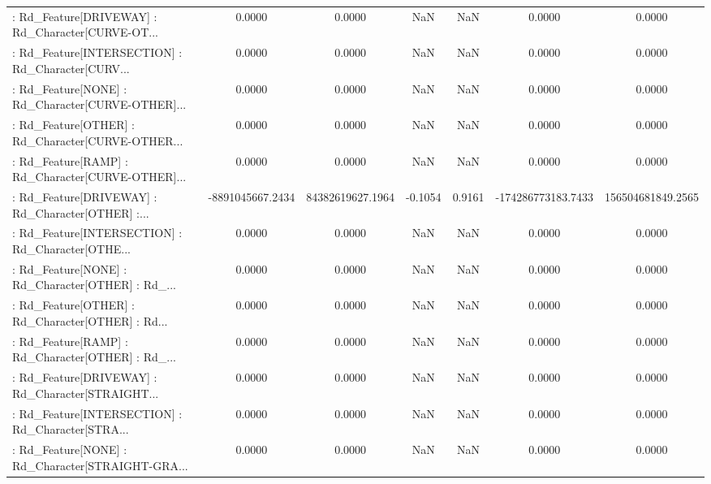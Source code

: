 \begin{longtable}{p{4cm}cccccc}
 : Rd\_Feature[DRIVEWAY] : Rd\_Character[CURVE-OT... &            0.0000 &            0.0000 &     NaN &          NaN &             0.0000 &            0.0000 \\
 : Rd\_Feature[INTERSECTION] : Rd\_Character[CURV... &            0.0000 &            0.0000 &     NaN &          NaN &             0.0000 &            0.0000 \\
 : Rd\_Feature[NONE] : Rd\_Character[CURVE-OTHER]... &            0.0000 &            0.0000 &     NaN &          NaN &             0.0000 &            0.0000 \\
 : Rd\_Feature[OTHER] : Rd\_Character[CURVE-OTHER... &            0.0000 &            0.0000 &     NaN &          NaN &             0.0000 &            0.0000 \\
 : Rd\_Feature[RAMP] : Rd\_Character[CURVE-OTHER]... &            0.0000 &            0.0000 &     NaN &          NaN &             0.0000 &            0.0000 \\
 : Rd\_Feature[DRIVEWAY] : Rd\_Character[OTHER] :... &  -8891045667.2434 &  84382619627.1964 & -0.1054 &       0.9161 & -174286773183.7433 & 156504681849.2565 \\
 : Rd\_Feature[INTERSECTION] : Rd\_Character[OTHE... &            0.0000 &            0.0000 &     NaN &          NaN &             0.0000 &            0.0000 \\
 : Rd\_Feature[NONE] : Rd\_Character[OTHER] : Rd\_... &            0.0000 &            0.0000 &     NaN &          NaN &             0.0000 &            0.0000 \\
 : Rd\_Feature[OTHER] : Rd\_Character[OTHER] : Rd... &            0.0000 &            0.0000 &     NaN &          NaN &             0.0000 &            0.0000 \\
 : Rd\_Feature[RAMP] : Rd\_Character[OTHER] : Rd\_... &            0.0000 &            0.0000 &     NaN &          NaN &             0.0000 &            0.0000 \\
 : Rd\_Feature[DRIVEWAY] : Rd\_Character[STRAIGHT... &            0.0000 &            0.0000 &     NaN &          NaN &             0.0000 &            0.0000 \\
 : Rd\_Feature[INTERSECTION] : Rd\_Character[STRA... &            0.0000 &            0.0000 &     NaN &          NaN &             0.0000 &            0.0000 \\
 : Rd\_Feature[NONE] : Rd\_Character[STRAIGHT-GRA... &            0.0000 &            0.0000 &     NaN &          NaN &             0.0000 &            0.0000 \\

\end{longtable}
